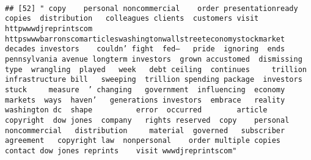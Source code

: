 \documentclass[
]{article}
\begin{document}
\begin{verbatim}
                                                                                                                                                                                                                                                                                                                                                                                                                                                                   
## [52] " copy    personal noncommercial    order presentationready copies  distribution   colleagues clients  customers visit httpwwwdjreprintscom httpswwwbarronscomarticleswashingtonwallstreeteconomystockmarket  decades investors    couldn’ fight  fed—   pride  ignoring  ends  pennsylvania avenue longterm investors  grown accustomed  dismissing  type  wrangling  played   week   debt ceiling  continues     trillion infrastructure bill   sweeping  trillion spending package  investors stuck     measure  ’ changing   government  influencing  economy  markets  ways  haven’   generations investors  embrace   reality    washington dc  shape          error  occurred        article      copyright  dow jones  company   rights reserved  copy    personal noncommercial   distribution     material  governed   subscriber agreement   copyright law  nonpersonal    order multiple copies  contact dow jones reprints    visit wwwdjreprintscom"                                                                                                                                                                                                                                                                                                                                                                                                                                                                                                                                                                                                                                                                                                                                                                                                                                                                                                                                                                                                                                                                                                                                                                                                                                                                                                                                                                                                                                                                                                                                                                                                                                                                                                                                                                                                                                                                                                                                                                                                         
\end{verbatim}
\end{document}
